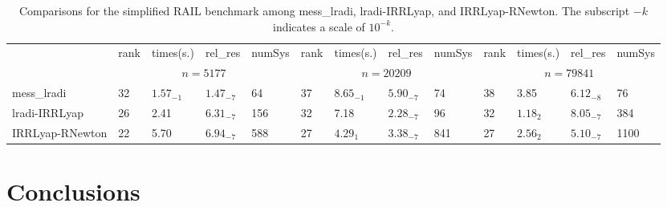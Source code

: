 \documentclass[11pt]{article}
\numberwithin{equation}{section}
\begin{document}
\begin{table}[htbp]
\caption{Comparisons for the simplified RAIL benchmark among mess\_lradi, lradi-IRRLyap, and IRRLyap-RNewton. The subscript $-k$ indicates a scale of $10^{-k}$.}
\centering
\setlength{\tabcolsep}{2.5pt}
{\scriptsize
\begin{tabular}{l|llll|llll|llll}
\hline
\multirow{2}{*}{} & rank & times(s.) & rel\_res    & numSys & rank & times(s.)  & rel\_res    & numSys & rank & times(s.)  & rel\_res    & numSys \\ \cline{2-13} 
                  & \multicolumn{4}{c|}{$n=5177$}           & \multicolumn{4}{c|}{$n=20209$}           & \multicolumn{4}{c}{$n=79841$}            \\ \hline
mess\_lradi       & 32   & $1.57_{-1}$ & $1.47_{-7}$ & 64     & 37   & $8.65_{-1}$ & $5.90_{-7}$ & 74     & 38   & 3.85        & $6.12_{-8}$ & 76     \\
lradi-IRRLyap      & 26   & 2.41      & $6.31_{-7}$ & 156    & 32   & 7.18       & $2.28_{-7}$ & 96     & 32   & $1.18_{2}$ & $8.05_{-7}$ & 384    \\
IRRLyap-RNewton     & 22   & 5.70        & $6.94_{-7}$ & 588    & 27   & $4.29_{1}$  & $3.38_{-7}$ & 841    & 27   & $2.56_{2}$ & $5.10_{-7}$ & 1100   \\ \hline
\end{tabular}
}
\label{NumExp-Table4}
\end{table}



\section{Conclusions} \label{Concl}
\end{document}
